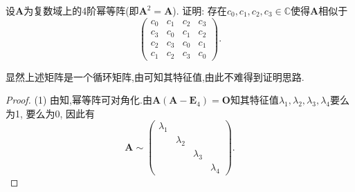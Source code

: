 \documentclass[../../main.tex]{subfiles}%
\begin{document}
\begin{example}
设$\boldsymbol{A}$为复数域上的4阶幂等阵(即$\boldsymbol{A}^2 = \boldsymbol{A}$). 证明: 存在$c_0,c_1,c_2,c_3 \in \mathbb{C}$使得$\boldsymbol{A}$相似于
$$
\begin{pmatrix}
c_0 & c_1 & c_2 & c_3 \\
c_3 & c_0 & c_1 & c_2 \\
c_2 & c_3 & c_0 & c_1 \\
c_1 & c_2 & c_3 & c_0
\end{pmatrix}.
$$
\end{example}
\begin{note}
显然上述矩阵是一个循环矩阵,由可知其特征值,由此不难得到证明思路.
\end{note}
\begin{proof}

(1) 由知,幂等阵可对角化.由$\boldsymbol{A}(\boldsymbol{A}-\boldsymbol{E}_4)=\boldsymbol{O}$知其特征值$\lambda_1,\lambda_2,\lambda_3,\lambda_4$要么为1, 要么为0, 因此有
$$
\boldsymbol{A} \sim \begin{pmatrix}
\lambda_1 & & & \\
& \lambda_2 & & \\
& & \lambda_3 & \\
& & & \lambda_4
\end{pmatrix}.
$$


\end{proof}
\end{document}
